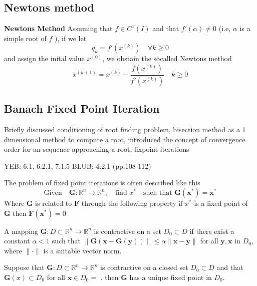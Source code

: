 \documentclass{article}
\theoremstyle{remark}
\begin{document}
 \subsection{Newtons method}
 \label{sub:newtons_method}

 \textbf{Newtons Method} Assuming that $f \in C^{1}\left( I \right)$ and that $f'\left( \alpha \right) \neq 0$ (i.e, $\alpha$ is a simple root of $f$  ), if we let \[
 q_{k} = f'\left( x^{(k)} \right) \quad \forall k \ge 0 
 \] 
 and assign the inital value $x^{(0)}$, we obstain the socalled Newtons method \[
 x^{(k+1)} = x^{(k)} - \frac{f\left( x^{(k)} \right)}{f'\left( x^{(k)} \right)} \quad k\ge 0 
 \] 


\subsection{Banach Fixed Point Iteration}%
\label{sub:banach_fixed_point_iteration}
\begin{tcolorbox}
  Briefly discussed conditioning of root finding problem, bisection method as a 1 dimensional method to compute a root, introduced the concept of convergence order for an sequence approaching a root, fixpoint iterations
  \par
  YEB: 6.1, 6.2.1, 7.1.5
  BLUB: 4.2.1 (pp.108-112)
\end{tcolorbox}

\par
The problem of fixed point iterations is often described like this \[
  \text{Given} \quad  \mathbf{G}: \mathbb{R}^{n} \to \mathbb{R}^{n}, \quad \text{find } x^{*} \quad \text{such that }  \mathbf{G} \left( \mathbf{x^{*}} \right) = \mathbf{x}^{*}   
\] 
Where $\mathbf{G}$ is related to $\mathbf{F}$ through the following property if $x^{*}$ is a fixed point of $\mathbf{G}$ then $\mathbf{F}\left( \mathbf{x^{*}} \right) = 0$ 

\begin{definition}[Contraction]
  A mapping $\mathbf{G}: D \subset \mathbb{R}^{n} \to \mathbb{R}^{n}$ is contractive on a set $D_0 \subset D$ if there exist a constant $\alpha < 1$ such that $\|\mathbf{G}\left( \mathbf{x} - \mathbf{G}\left( \mathbf{y} \right) \right)\| \le \alpha \|\mathbf{x} - \mathbf{y}\|$ for all $\mathbf{y}, \mathbf{x} $ in $D_0$, where $\|\cdot \|$ is a suitable vector norm.
\end{definition}


\begin{theorem}
  Suppose that $\mathbf{G}: D \subset \mathbb{R}^{n} \to \mathbb{R}^{n}$ is contractive on a closed set $D_0 \subset D$ and that $\mathbf{G}\left( x \right) \subset D_0$ for all $\mathbf{x} \in D_0=$ . then $\mathbf{G}$ has a unique fixed point in $D_0$.  
\end{theorem}
\end{document}
